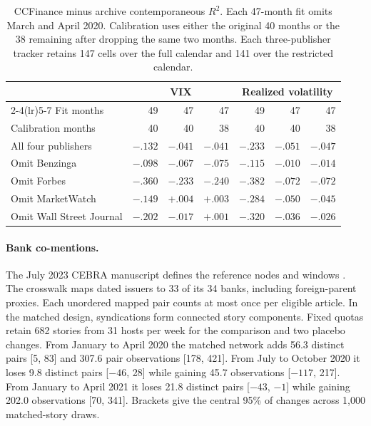 \begin{table}[t]
  \centering
  \small
  \caption{CCFinance minus archive contemporaneous $R^2$. Each 47-month
    fit omits March and April 2020. Calibration uses either the original
    40 months or the 38 remaining after dropping the same two months.
    Each three-publisher tracker retains 147 cells over the full calendar
  and 141 over the restricted calendar.}
  \label{tab:app-emv}
  \begin{tabular}{lrrrrrr}
    \toprule
    & \multicolumn{3}{c}{VIX} & \multicolumn{3}{c}{Realized volatility} \\
    \cmidrule(lr){2-4}\cmidrule(lr){5-7}
    Fit months & 49 & 47 & 47 & 49 & 47 & 47 \\
    Calibration months & 40 & 40 & 38 & 40 & 40 & 38 \\
    \midrule
    All four publishers & $-.132$ & $-.041$ & $-.041$ & $-.233$ &
    $-.051$ & $-.047$ \\
    Omit Benzinga & $-.098$ & $-.067$ & $-.075$ & $-.115$ & $-.010$ & $-.014$ \\
    Omit Forbes & $-.360$ & $-.233$ & $-.240$ & $-.382$ & $-.072$ & $-.072$ \\
    Omit MarketWatch & $-.149$ & $+.004$ & $+.003$ & $-.284$ &
    $-.050$ & $-.045$ \\
    Omit Wall Street Journal & $-.202$ & $-.017$ & $+.001$ & $-.320$
    & $-.036$ & $-.026$ \\
    \bottomrule
  \end{tabular}
\end{table}

\paragraph{Bank co-mentions.}
The July 2023 CEBRA manuscript defines the reference nodes and windows
\citep{kazinnik2023ms}. The crosswalk maps dated issuers to 33 of its
34 banks, including foreign-parent proxies. Each unordered mapped pair
counts at most once per eligible article. In the matched design,
syndications form connected story components. Fixed quotas retain
682 stories from 31 hosts per week for the comparison and two placebo
changes. From January to April 2020 the matched network adds 56.3
distinct pairs [5, 83] and 307.6 pair observations [178, 421]. From
July to October 2020 it loses 9.8 distinct pairs [$-46$, 28] while
gaining 45.7 observations [$-117$, 217]. From January to April 2021
it loses 21.8 distinct pairs [$-43$, $-1$] while gaining 202.0
observations [70, 341]. Brackets give the central 95\% of changes
across 1,000 matched-story draws.


